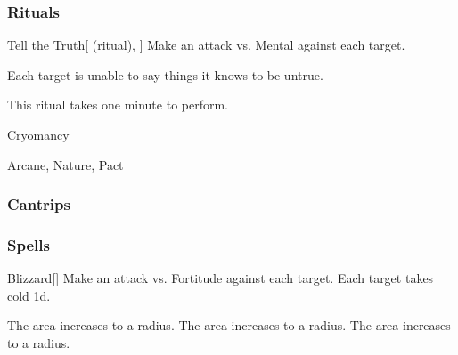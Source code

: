 \subsubsection{Rituals}


\lowercase{\hypertarget{spell:Tell the Truth}{}}\label{spell:Tell the Truth}
\begin{attuneability}[Rank 4]{\hypertarget{spell:Tell the Truth}{Tell the Truth}}[ (ritual), ]
Make an attack vs. Mental against each target.

\hit Each target is unable to say things it knows to be untrue.

This ritual takes one minute to perform.
\end{attuneability}
\vspace{0.25em}


\newpage
\begin{spellsection}{Cryomancy}

\begin{spellheader}
\end{spellheader}


 Arcane, Nature, Pact

\subsubsection{Cantrips}


\end{spellsection}


\subsubsection{Spells}


\lowercase{\hypertarget{spell:Blizzard}{}}\label{spell:Blizzard}
\begin{freeability}[Rank 1]{\hypertarget{spell:Blizzard}{Blizzard}}[]
Make an attack vs. Fortitude against each target.
\hit Each target takes cold  \minus1d.

\rankline
{} The area increases to a \areamed radius.
 The area increases to a \arealarge radius.
 The area increases to a \areahuge radius.
\end{freeability}
\vspace{0.25em}



